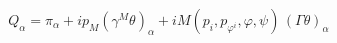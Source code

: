 \begin{equation}\label{Q}
Q_\alpha=\pi_\alpha+ip_M(\gamma^M\theta)_\alpha +
iM(p_i,p_{\varphi^i},\varphi,\psi)\,(\Gamma\theta)_\alpha\,
\end{equation}

